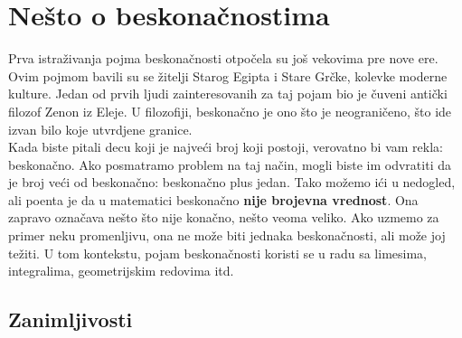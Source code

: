 \documentclass[a4paper]{article}
\begin{document}
\section{Nešto o beskonačnostima}
\label{poglavlje:Nešto o beskonačnostima}

Prva istraživanja pojma beskonačnosti otpočela su još vekovima pre nove ere. Ovim pojmom bavili su se žitelji Starog Egipta i Stare Grčke, kolevke moderne kulture. Jedan od prvih ljudi zainteresovanih za taj pojam bio je čuveni antički filozof Zenon iz Eleje. \cite{Zenon} U filozofiji, beskonačno je ono što je neograničeno, što ide izvan bilo koje utvrdjene granice\cite{weyl2013levels}.\\

Kada biste pitali decu koji je najveći broj koji postoji, verovatno bi vam rekla: beskonačno. Ako posmatramo problem na taj način, mogli biste im odvratiti da je broj veći od beskonačno: beskonačno plus jedan. Tako možemo ići u nedogled, ali poenta je da u matematici beskonačno \textbf{nije brojevna vrednost}. Ona zapravo označava nešto što nije konačno, nešto veoma veliko. Ako uzmemo za primer neku promenljivu, ona ne može biti jednaka beskonačnosti, ali može joj težiti. U tom kontekstu, pojam beskonačnosti koristi se u radu sa limesima, integralima, geometrijskim redovima itd.\\


\subsection{Zanimljivosti}
\end{document}

